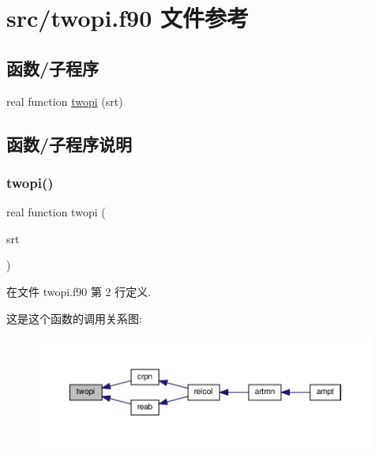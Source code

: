 \hypertarget{twopi_8f90}{}\section{src/twopi.f90 文件参考}
\label{twopi_8f90}
\subsection*{函数/子程序}
\begin{DoxyCompactItemize}
\item 
real function \mbox{\hyperlink{twopi_8f90_aeed17254963d14353680b9ff67b7b7f1}{twopi}} (srt)
\end{DoxyCompactItemize}


\subsection{函数/子程序说明}
\mbox{\label{twopi_8f90_aeed17254963d14353680b9ff67b7b7f1}} 
\subsubsection{\texorpdfstring{twopi()}{twopi()}}
{\footnotesize\ttfamily real function twopi (\begin{DoxyParamCaption}\item[{}]{srt }\end{DoxyParamCaption})}



在文件 twopi.\+f90 第 2 行定义.

这是这个函数的调用关系图\+:
\nopagebreak
\begin{figure}[H]
\begin{center}
\leavevmode
\includegraphics[width=350pt]{twopi_8f90_aeed17254963d14353680b9ff67b7b7f1_icgraph}
\end{center}
\end{figure}
